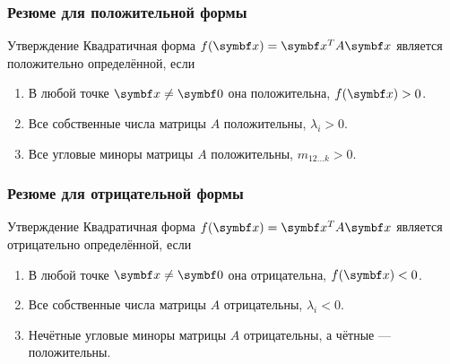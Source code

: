 \begin{frame}
    \frametitle{Резюме для положительной формы}

    \begin{block}{Утверждение}
        Квадратичная форма $f(\bx) = \bx^T A\bx$ является положительно определённой, если \pause

        \begin{enumerate}
            \item В любой точке $\bx\neq \bzero$ она положительна, $f(\bx) > 0$. \pause
            \item Все собственные числа матрицы $A$ положительны, $\lambda_i > 0$. \pause
            \item Все угловые миноры матрицы $A$ положительны, $m_{12\ldots k} > 0$.
        \end{enumerate}
            
    \end{block}


\end{frame}


\begin{frame}
    \frametitle{Резюме для отрицательной формы}

    \begin{block}{Утверждение}
        Квадратичная форма $f(\bx) = \bx^T A\bx$ является отрицательно определённой, если \pause

        \begin{enumerate}
            \item В любой точке $\bx\neq \bzero$ она отрицательна, $f(\bx) < 0$. \pause
            \item Все собственные числа матрицы $A$ отрицательны, $\lambda_i < 0$. \pause
            \item Нечётные угловые миноры матрицы $A$ отрицательны, а чётные — положительны.
        \end{enumerate}
            
    \end{block}


\end{frame}




